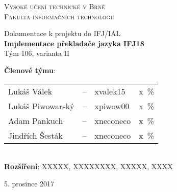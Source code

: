 \documentclass[11pt, a4paper]{article}
\begin{document}
\begin{titlepage}
\begin{center}
	
{\Huge \textsc{Vysoké učení technické v Brně \\
\vspace{0.5em}
}}
{\huge	 \textsc{Fakulta informačních technologií}
}

\begin{LARGE}
Dokumentace k projektu do IFJ/IAL \\
\vspace{0.3em}
{\Huge \textbf{Implementace překladače jazyka IFJ18}} \\
\vspace{0.3em}
{\huge Tým 106, varianta II}  \\
\end{LARGE}



\end{center}

{\Large\begin{flushleft}
      \textbf{Členové týmu}: \vspace{-0.8em}
    \end{flushleft}

    \begin{tabular}{lclc}
Lukáš Válek      & -- & xvalek15   &  x \,\% \\
Lukáš Piwowarský & -- & xpiwow00   &  x \,\% \\
Adam Pankuch     & -- & xneconeco  &  x \,\% \\
Jindřích Šesták  & -- & xneconeco  &  x \,\%
    \end{tabular}} \\\vspace{0.3em}
    {\Large \textbf{Rozšíření}: XXXXX, XXXXXXXX, XXXXX, XXXX} \\\vspace{0.3em}
    \begin{flushright}
      {\Large 5. prosince 2017}
    \end{flushright}
\end{titlepage}




\end{document}
